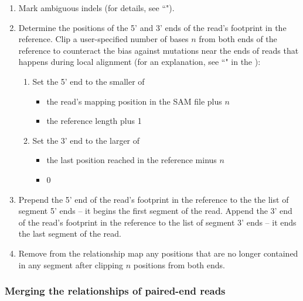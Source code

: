 \documentclass[11pt]{article}
\begin{document}
\begin{enumerate}
\begin{enumerate}
        \item If the position to be marked already appears in the map because it has another mutation, then add the insertion code on top of the existing relationship code using bitwise OR. For example, if the position 3' of an insertion were already a substitution to T (10000000), then the result would be 10001000 after marking the insertion.
    \end{enumerate}
    \item Mark ambiguous indels (for details, see ``").
    \item Determine the positions of the 5' and 3' ends of the read's footprint in the reference.
    Clip a user-specified number of bases $n$ from both ends of the reference to counteract the bias against mutations near the ends of reads that happens during local alignment (for an explanation, see ``" in the ):
    \begin{enumerate}
        \item Set the 5' end to the smaller of
        \begin{itemize}
            \item the read's mapping position in the SAM file plus $n$
            \item the reference length plus 1
        \end{itemize}
        \item Set the 3' end to the larger of
        \begin{itemize}
            \item the last position reached in the reference minus $n$
            \item 0
        \end{itemize}
    \end{enumerate}
    \item Prepend the 5' end of the read's footprint in the reference to the the list of segment 5' ends -- it begins the first segment of the read. Append the 3' end of the read's footprint in the reference to the list of segment 3' ends -- it ends the last segment of the read.
    \item Remove from the relationship map any positions that are no longer contained in any segment after clipping $n$ positions from both ends.
\end{enumerate}

\subsubsection{Merging the relationships of paired-end reads}
\end{document}
